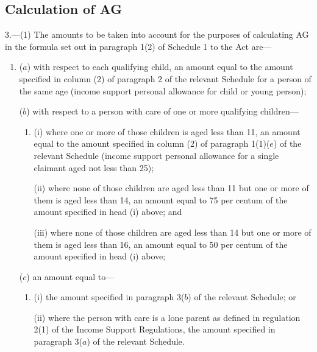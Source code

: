 \documentclass[a4paper]{article}
\begin{document}
\subsection[3. Calculation of AG]{Calculation of AG}

3.—(1) The amounts to be taken into account for the purposes of calculating AG in the formula set out in paragraph 1(2) of Schedule 1 to the Act are—
\begin{enumerate}\item[]
($a$) with respect to each qualifying child, an amount equal to the amount specified in column (2) of paragraph 2 of the relevant Schedule for a person of the same age (income support personal allowance for child or young person);


($b$) with respect to a person with care of one or more qualifying children—
\begin{enumerate}\item[]
(i) where one or more of those children is aged less than 11, an amount equal to the amount specified in column (2) of paragraph 1(1)($e$) of the relevant Schedule (income support personal allowance for a single claimant aged not less than 25);

(ii) where none of those children are aged less than 11 but one or more of them is aged less than 14, an amount equal to 75 per centum of the amount specified in head (i) above; and

(iii) where none of those children are aged less than 14 but one or more of them is aged less than 16, an amount equal to 50 per centum of the amount specified in head (i) above;
\end{enumerate} %


($c$) an amount equal to—
\begin{enumerate}\item[]
(i) the amount specified in paragraph 3($b$) of the relevant Schedule; or

(ii) where the person with care is a lone parent as defined in regulation 2(1) of the Income Support Regulations, the amount specified in paragraph 3($a$) of the relevant Schedule.
\end{enumerate}

\end{enumerate}
\end{document}
